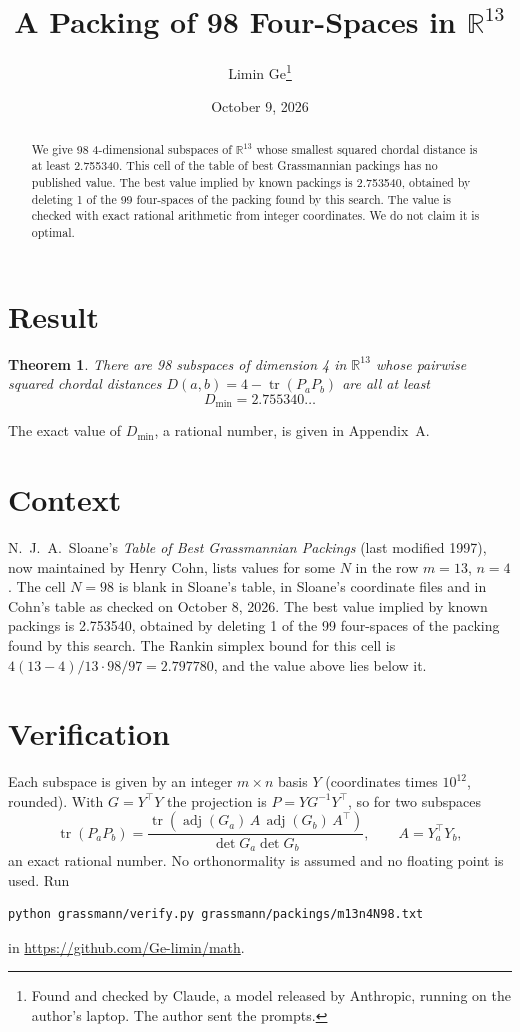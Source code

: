 \documentclass[11pt,a4paper]{article}
\title{A Packing of 98 Four-Spaces in $\mathbb{R}^{13}$}
\author{Limin Ge\thanks{Found and checked by Claude, a model released by Anthropic, running on the author's laptop. The author sent the prompts.}}
\date{October 9, 2026}
\newtheorem*{theorem}{Theorem}
\begin{document}
\maketitle
\begin{abstract}
We give 98 4-dimensional subspaces of $\mathbb{R}^{13}$ whose smallest squared chordal distance is at least 2.755340. This cell of the table of best Grassmannian packings has no published value. The best value implied by known packings is 2.753540, obtained by deleting 1 of the 99 four-spaces of the packing found by this search. The value is checked with exact rational arithmetic from integer coordinates. We do not claim it is optimal.
\end{abstract}

\section{Result}
\begin{theorem}
There are 98 subspaces of dimension 4 in $\mathbb{R}^{13}$ whose pairwise squared chordal distances $D(a,b) = 4 - \operatorname{tr}(P_aP_b)$ are all at least
\[ D_{\min} = 2.755340\ldots \]
\end{theorem}
The exact value of $D_{\min}$, a rational number, is given in Appendix~A.


\section{Context}
N.~J.~A.~Sloane's \emph{Table of Best Grassmannian Packings} (last modified 1997), now maintained by Henry Cohn, lists values for some $N$ in the row $m=13$, $n=4$. The cell $N=98$ is blank in Sloane's table, in Sloane's coordinate files and in Cohn's table as checked on October 8, 2026. The best value implied by known packings is 2.753540, obtained by deleting 1 of the 99 four-spaces of the packing found by this search. The Rankin simplex bound for this cell is $4(13-4)/13\cdot 98/97 = 2.797780$, and the value above lies below it.


\section{Verification}
Each subspace is given by an integer $m\times n$ basis $Y$ (coordinates times $10^{12}$, rounded). With $G=Y^\top Y$ the projection is $P=YG^{-1}Y^\top$, so for two subspaces
\[ \operatorname{tr}(P_aP_b)=\frac{\operatorname{tr}(\operatorname{adj}(G_a)\,A\,\operatorname{adj}(G_b)\,A^\top)}{\det G_a\det G_b},\qquad A=Y_a^\top Y_b, \]
an exact rational number. No orthonormality is assumed and no floating point is used. Run
\begin{verbatim}
python grassmann/verify.py grassmann/packings/m13n4N98.txt
\end{verbatim}
in \url{https://github.com/Ge-limin/math}.
\end{document}
